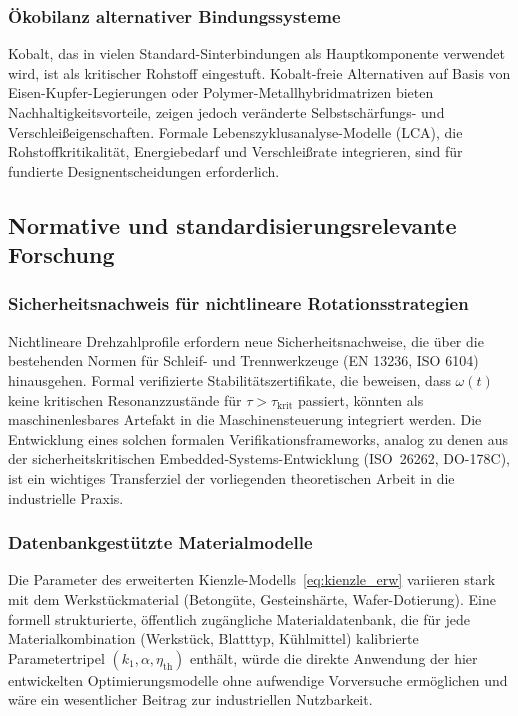 ﻿\documentclass[a4paper,12pt]{article}
\theoremstyle{definition}
\begin{document}
\subsubsection{Ökobilanz alternativer Bindungssysteme}

Kobalt, das in vielen Standard-Sinterbindungen als Hauptkomponente verwendet wird,
ist als kritischer Rohstoff eingestuft. Kobalt-freie Alternativen auf Basis von
Eisen-Kupfer-Legierungen oder Polymer-Metallhybridmatrizen bieten Nachhaltigkeitsvorteile,
zeigen jedoch veränderte Selbstschärfungs- und Verschleißeigenschaften. Formale
Lebenszyklusana\-lyse-Modelle (LCA), die Rohstoffkritikalität, Energiebedarf und
Verschleißrate integrieren, sind für fundierte Designentscheidungen erforderlich.

\subsection{Normative und standardisierungsrelevante Forschung}

\subsubsection{Sicherheitsnachweis für nichtlineare Rotationsstrategien}

Nichtlineare Drehzahlprofile erfordern neue Sicherheitsnachweise, die über die
bestehenden Normen für Schleif- und Trennwerkzeuge (EN 13236, ISO 6104) hinausgehen.
Formal verifizierte Stabilitätszertifikate, die beweisen, dass $\omega(t)$ keine
kritischen Resonanzzustände für $\tau > \tau_{\mathrm{krit}}$ passiert, könnten
als maschinenlesbares Artefakt in die Maschinensteuerung integriert werden.
Die Entwicklung eines solchen formalen Verifikationsframeworks, analog zu denen aus
der sicherheitskritischen Embedded-Systems-Entwicklung (ISO~26262, DO-178C), ist
ein wichtiges Transferziel der vorliegenden theoretischen Arbeit in die industrielle Praxis.

\subsubsection{Datenbankgestützte Materialmodelle}

Die Parameter des erweiterten Kienzle-Modells~\eqref{eq:kienzle_erw} variieren
stark mit dem Werkstückmaterial (Betongüte, Gesteinshärte, Wafer-Dotierung).
Eine formell strukturierte, öffentlich zugäng\-liche Materialdatenbank, die für
jede Materialkombination (Werkstück, Blatttyp, Kühlmittel) kalibrierte Parametertripel
$(k_1, \alpha, \eta_{\mathrm{th}})$ enthält, würde die direkte Anwendung der hier
entwickelten Optimierungsmodelle ohne aufwendige Vorversuche ermöglichen und wäre
ein wesentlicher Beitrag zur industriellen Nutzbarkeit.
\end{document}
